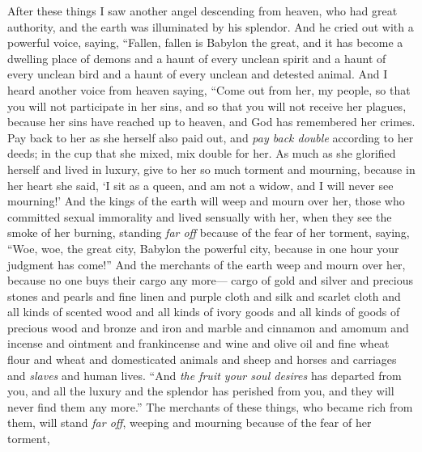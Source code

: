 \begin{biblechapter} %
 After these things I saw another angel descending from heaven, who had great authority, and the earth was illuminated by his splendor.
\verse And he cried out with a powerful voice, saying,
\verse “Fallen, fallen is Babylon the great, 
and it has become a dwelling place of demons 
and a haunt of every unclean spirit 
and a haunt of every unclean bird 
and a haunt of every unclean and detested animal.
\verse And I heard another voice from heaven saying,
\verse “Come out from her, my people, 
so that you will not participate in her sins, 
and so that you will not receive her plagues,
\verse because her sins have reached up to heaven, 
and God has remembered her crimes.
\verse Pay back to her as she herself also paid out, 
and \textit{pay back double} according to her deeds; 
in the cup that she mixed, mix double for her.
\verse As much as she glorified herself and lived in luxury, 
give to her so much torment and mourning, 
because in her heart she said, 
‘I sit as a queen, and am not a widow, 
and I will never see mourning!’
\verse And the kings of the earth will weep and mourn over her, those who committed sexual immorality and lived sensually with her, when they see the smoke of her burning,
\verse standing \textit{far off} because of the fear of her torment, saying, “Woe, woe, the great city, 
Babylon the powerful city, 
because in one hour your judgment has come!”
\verse And the merchants of the earth weep and mourn over her, because no one buys their cargo any more—
\verse cargo of gold and silver and precious stones and pearls and fine linen and purple cloth and silk and scarlet cloth and all kinds of scented wood and all kinds of ivory goods and all kinds of goods of precious wood and bronze and iron and marble
\verse and cinnamon and amomum and incense and ointment and frankincense and wine and olive oil and fine wheat flour and wheat and domesticated animals and sheep and horses and carriages and \textit{slaves} and human lives.
\verse “And \textit{the fruit your soul desires} has departed from you, 
and all the luxury and the splendor has perished from you, 
and they will never find them any more.”
\verse The merchants of these things, who became rich from them, will stand \textit{far off}, weeping and mourning because of the fear of her torment,

\end{biblechapter}
